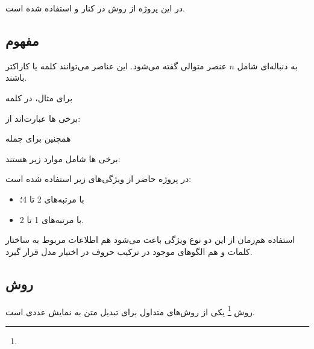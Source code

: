 \documentclass[12pt,a4paper,oneside]{report}
\begin{document}
در این پروژه از روش
در کنار
و
استفاده شده است.


\subsection{مفهوم }

به دنباله‌ای شامل $n$ عنصر متوالی گفته می‌شود. این عناصر می‌توانند کلمه یا کاراکتر باشند.

برای مثال، در کلمه

\begin{center}
\end{center}

برخی
ها عبارت‌اند از:

\begin{center}
\end{center}

همچنین برای جمله

\begin{center}
\end{center}

برخی
ها شامل موارد زیر هستند:

\begin{center}
\end{center}

در پروژه حاضر از ویژگی‌های زیر استفاده شده است:

\begin{itemize}
	\item {} با مرتبه‌های 2 تا 4؛
	\item {} با مرتبه‌های 1 تا 2.
\end{itemize}

استفاده هم‌زمان از این دو نوع ویژگی باعث می‌شود هم اطلاعات مربوط به ساختار کلمات و هم الگوهای موجود در ترکیب حروف در اختیار مدل قرار گیرد.


\subsection{روش }

روش
\footnote{}
یکی از روش‌های متداول برای تبدیل متن به نمایش عددی است.
\end{document}
